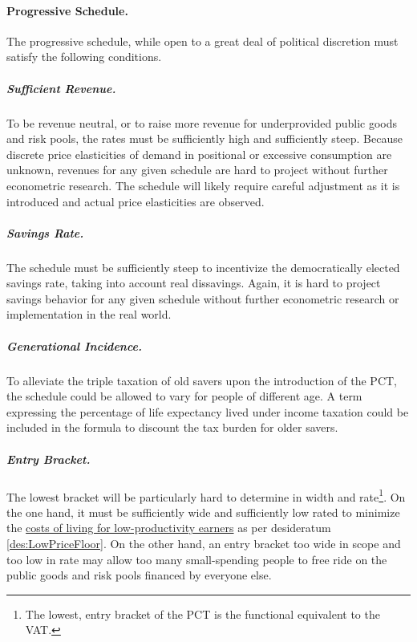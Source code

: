 \paragraph{Progressive Schedule.} The progressive schedule, while open to a great deal of political discretion must satisfy the following conditions.
\subparagraph{Sufficient Revenue.} To be revenue neutral, or to raise more revenue for underprovided public goods and risk pools, the rates must be sufficiently high and sufficiently steep. Because discrete price elasticities of demand in positional or excessive consumption are unknown, revenues for any given schedule are hard to project without further econometric research.
The schedule will likely require careful adjustment as it is introduced and actual price elasticities are observed.
\subparagraph{Savings Rate.} The schedule must be sufficiently steep to incentivize the democratically elected savings rate, taking into account real dissavings. Again, it is hard to project savings behavior for any given schedule without further econometric research or implementation in the real world.
\subparagraph{Generational Incidence.} To alleviate the triple taxation of old savers upon the introduction of the PCT, the schedule could be allowed to vary for people of different age. A term expressing the percentage of life expectancy lived under income taxation could be included in the formula to discount the tax burden for older savers.
\subparagraph{Entry Bracket.} The lowest bracket will be particularly hard to determine in width and rate\footnote{
	The lowest, entry bracket of the PCT is the functional equivalent to the VAT.}.
On the one hand, it must be sufficiently wide and sufficiently low rated to minimize the \hyperref[des:LowPriceFloor]{costs of living for low-productivity earners} as per desideratum \ref{des:LowPriceFloor}. On the other hand, an entry bracket too wide in scope and too low in rate may allow too many small-spending people to free ride on the public goods and risk pools financed by everyone else.

